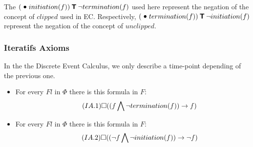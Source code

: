 The $(\previous initiation(f)) \trigger \neg termination(f)$ used here represent the negation of the concept of $clipped$ used in EC.
Respectively, $(\previous termination(f)) \trigger \neg initiation(f)$ represent the negation of the concept of $unclipped$.

\subsubsection{Iteratifs Axioms}

In the the Discrete Event Calculus, we only describe a time-point depending of the previous one.

\begin{itemize}
  \item
    For every $Fl$ in $\Phi$ there is this formula in $F$:
    \begin{equation}\tag{$IA.1$}
      \square((f \bigwedge \neg termination(f)) \rightarrow f)
    \end{equation}
  \item
    For every $Fl$ in $\Phi$ there is this formula in $F$:
    \begin{equation}\tag{$IA.2$}
      \square((\neg f \bigwedge \neg initiation(f)) \rightarrow \neg f)
    \end{equation}
\end{itemize}

